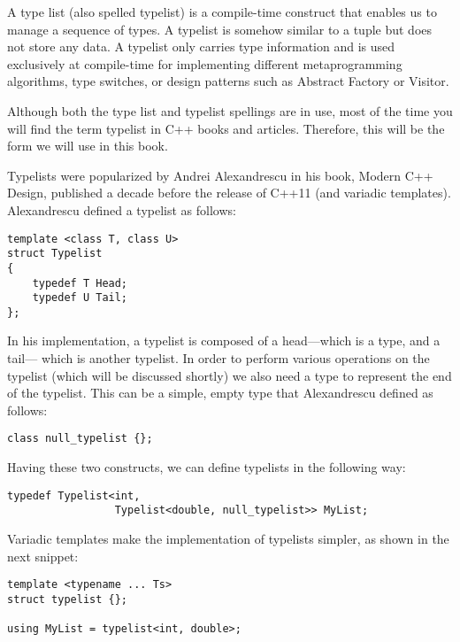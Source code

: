 
A type list (also spelled typelist) is a compile-time construct that enables us to manage a sequence of types. A typelist is somehow similar to a tuple but does not store any data. A typelist only carries type information and is used exclusively at compile-time for implementing different metaprogramming algorithms, type switches, or design patterns such as Abstract Factory or Visitor.

\begin{tcolorbox}[breakable,enhanced jigsaw,colback=blue!5!white,colframe=blue!75!black,title={重要的Note}]
Although both the type list and typelist spellings are in use, most of the time you will find the term typelist in C++ books and articles. Therefore, this will be the form we will use in this book.
\end{tcolorbox}

Typelists were popularized by Andrei Alexandrescu in his book, Modern C++ Design, published a decade before the release of C++11 (and variadic templates). Alexandrescu defined a typelist as follows:

\begin{lstlisting}[style=styleCXX]
template <class T, class U>
struct Typelist
{
	typedef T Head;
	typedef U Tail;
};
\end{lstlisting}

In his implementation, a typelist is composed of a head—which is a type, and a tail— which is another typelist. In order to perform various operations on the typelist (which will be discussed shortly) we also need a type to represent the end of the typelist. This can be a simple, empty type that Alexandrescu defined as follows:

\begin{lstlisting}[style=styleCXX]
class null_typelist {};
\end{lstlisting}

Having these two constructs, we can define typelists in the following way:

\begin{lstlisting}[style=styleCXX]
typedef Typelist<int,
				 Typelist<double, null_typelist>> MyList;
\end{lstlisting}

Variadic templates make the implementation of typelists simpler, as shown in the next snippet:

\begin{lstlisting}[style=styleCXX]
template <typename ... Ts>
struct typelist {};

using MyList = typelist<int, double>;
\end{lstlisting}

